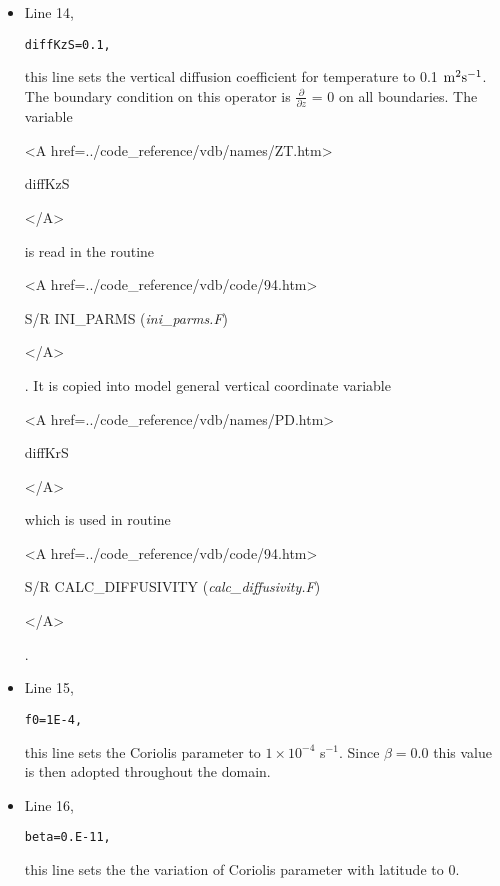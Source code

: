 \begin{itemize}
\item Line 14,
\begin{verbatim}
diffKzS=0.1,
\end{verbatim}
this line sets the vertical diffusion coefficient for temperature
to 0.1 ${\rm m^{2}s^{-1}}$. The boundary condition on this
operator is $\frac{\partial}{\partial z}$ = 0 on all boundaries.
The variable
{\bf
\begin{rawhtml} <A href=../code_reference/vdb/names/ZT.htm> \end{rawhtml}
diffKzS
\begin{rawhtml} </A>\end{rawhtml}
}
is read in the routine
{\it
\begin{rawhtml} <A href=../code_reference/vdb/code/94.htm> \end{rawhtml}
S/R INI\_PARMS ({\it ini\_parms.F})
\begin{rawhtml} </A>\end{rawhtml}
}.
It is copied into model general vertical coordinate variable
{\bf
\begin{rawhtml} <A href=../code_reference/vdb/names/PD.htm> \end{rawhtml}
diffKrS
\begin{rawhtml} </A>\end{rawhtml}
} which is used in routine 
{\it 
\begin{rawhtml} <A href=../code_reference/vdb/code/94.htm> \end{rawhtml}
S/R CALC\_DIFFUSIVITY ({\it calc\_diffusivity.F})
\begin{rawhtml} </A>\end{rawhtml}
}.


\item Line 15,
\begin{verbatim}
f0=1E-4,
\end{verbatim}
this line sets the Coriolis parameter to $1 \times 10^{-4}$ s$^{-1}$. 
Since $\beta = 0.0$ this value is then adopted throughout the domain.

 
\item Line 16,
\begin{verbatim}
beta=0.E-11,
\end{verbatim}
this line sets the the variation of Coriolis parameter with latitude to $0$.



\end{itemize}
